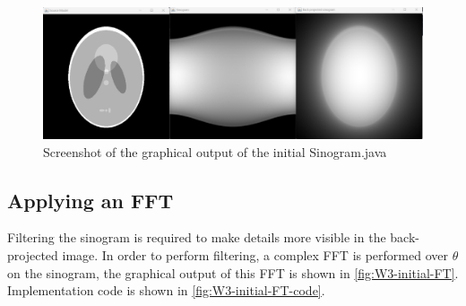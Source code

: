 \begin{figure}[H] 
    \centering
    \includegraphics[width=0.9\columnwidth]{Figures/Week 3/initial-graphics.png}
    \caption{Screenshot of the graphical output of the initial Sinogram.java}
    \label{fig:W3-initial-output}
\end{figure}


\subsection{Applying an FFT}
Filtering the sinogram is required to make details more visible in the back-projected image. In order to perform filtering, a complex FFT is performed over \(\theta\) on the sinogram, the graphical output of this FFT is shown in \autoref{fig:W3-initial-FT}. Implementation code is shown in \autoref{fig:W3-initial-FT-code}.

